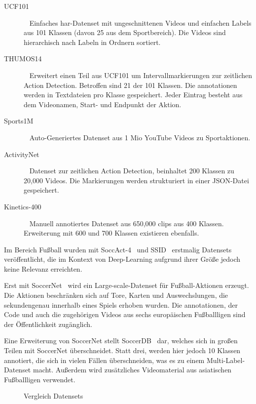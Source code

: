 \begin{description}
    \item[UCF101]~\cite{Soomro12} Einfaches \gls{har}-Datenset mit ungeschnittenen Videos und einfachen Labels aus 101 Klassen (davon 25 aus dem Sportbereich).
    Die Videos sind hierarchisch nach Labeln in Ordnern sortiert.
    \item[THUMOS14]~\cite{THUMOS14} Erweitert einen Teil aus UCF101 um Intervallmarkierungen zur zeitlichen Action Detection.
    Betroffen sind 21 der 101 Klassen.
    Die \gls{annotationen} werden in Textdateien pro Klasse gespeichert.
    Jeder Eintrag besteht aus dem Videonamen, Start- und Endpunkt der Aktion.
    \item[Sports1M]~\cite{Karpathy14} Auto-Generiertes Datenset aus 1 Mio YouTube Videos zu Sportaktionen.
    \item[ActivityNet]~\cite{Caba15} Datenset zur zeitlichen Action Detection, beinhaltet 200 Klassen zu 20,000 Videos.
    Die Markierungen werden strukturiert in einer JSON-Datei gespeichert.
    \item[Kinetics-400]~\cite{Kay17} Manuell annotiertes Datenset aus 650,000 \glspl{clip} aus 400 Klassen.
    Erweiterung mit 600 und 700 Klassen existieren ebenfalls.
\end{description}

Im Bereich Fußball wurden mit SoccAct-4~\cite{Ballan09} und SSID~\cite{Jiang16} erstmalig Datensets veröffentlicht, die im Kontext von Deep-Learning aufgrund ihrer Größe jedoch keine Relevanz erreichten.

Erst mit SoccerNet~\cite{Giancola18} wird ein Large-scale-Datenset für Fußball-Aktionen erzeugt.
Die Aktionen beschränken sich auf Tore, Karten und Auswechslungen, die sekundengenau innerhalb eines Spiels erhoben wurden.
Die \gls{annotationen}, der Code und auch die zugehörigen Videos aus sechs europäischen Fußballligen sind der Öffentlichkeit zugänglich.

Eine Erweiterung von SoccerNet stellt SoccerDB~\cite{Jiang19} dar, welches sich in großen Teilen mit SoccerNet überschneidet.
Statt drei, werden hier jedoch 10 Klassen annotiert, die sich in vielen Fällen überschneiden, was es zu einem Multi-Label-Datenset macht.
Außerdem wird zusätzliches Videomaterial aus asiatischen Fußballligen verwendet.

\begin{figure}
    \centering
    \caption[Vergleich Datensets]{Vergleich Datensets}
    \label{tab:dataset}
\end{figure}


